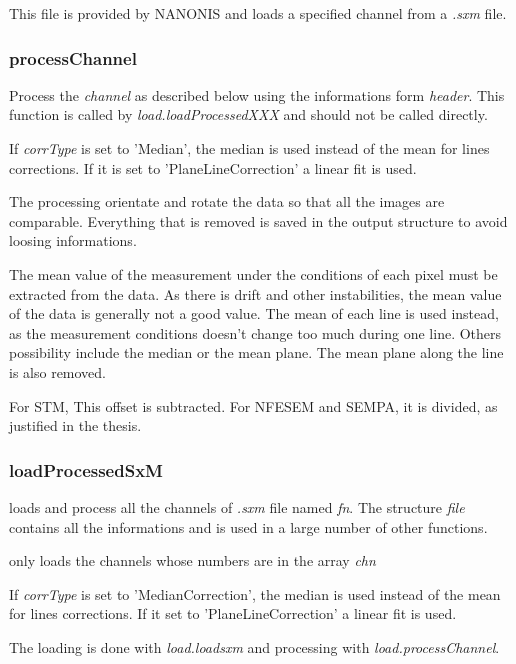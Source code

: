 This file is provided by NANONIS and loads a specified channel from a \emph{.sxm} file.

\subsubsection{processChannel}

\bdf
{} Process the \emph{channel} as described below using the informations form \emph{header}. This function is called by \emph{load.loadProcessedXXX} and should not be called directly.

 If \emph{corrType} is set to 'Median', the median is used instead of the mean for lines corrections. If it is set to 'PlaneLineCorrection' a linear fit is used.  
\edf

The processing orientate and rotate the data so that all the images are comparable.
Everything that is removed is saved in the output structure to avoid loosing informations.

The mean value of the measurement under the conditions of each pixel must be extracted from the data. As there is drift and other instabilities, the mean value of the data is generally not a good value. The mean of each line is used instead, as the measurement conditions doesn't change too much during one line. Others possibility include the median or the mean plane. The mean plane along the line is also removed.

For STM, This offset is subtracted. For NFESEM and SEMPA, it is divided, as justified in the thesis.

\subsubsection{loadProcessedSxM}
\bdf
{} loads and process all the channels of \emph{.sxm} file named \emph{fn}. The structure \emph{file} contains all the informations and is used in a large number of other functions.

 only loads the channels whose numbers are in the array \emph{chn}

 If \emph{corrType} is set to 'MedianCorrection', the median is used instead of the mean for lines corrections. If it set to 'PlaneLineCorrection' a linear fit is used. 

\edf

The loading is done with \emph{load.loadsxm} and processing with \emph{load.processChannel}.

